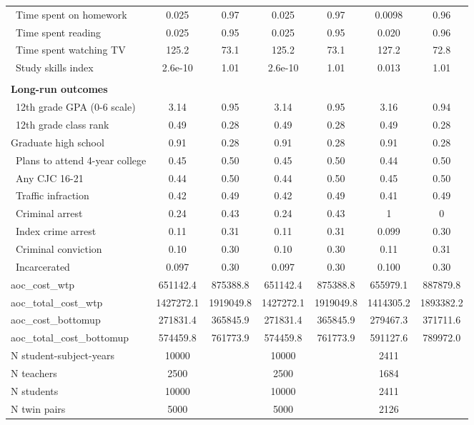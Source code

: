 {\begin{tabular}{l*{3}{cc}}
\ Time spent on homework&       0.025&        0.97&       0.025&        0.97&      0.0098&        0.96\\
\ Time spent reading&       0.025&        0.95&       0.025&        0.95&       0.020&        0.96\\
\ Time spent watching TV&       125.2&        73.1&       125.2&        73.1&       127.2&        72.8\\
\ Study skills index&     2.6e-10&        1.01&     2.6e-10&        1.01&       0.013&        1.01\\
\\ \textbf{Long-run outcomes}\\ \ 12th grade GPA (0-6 scale)&        3.14&        0.95&        3.14&        0.95&        3.16&        0.94\\
\ 12th grade class rank&        0.49&        0.28&        0.49&        0.28&        0.49&        0.28\\
Graduate high school&        0.91&        0.28&        0.91&        0.28&        0.91&        0.28\\
\ Plans to attend 4-year college&        0.45&        0.50&        0.45&        0.50&        0.44&        0.50\\
\ Any CJC 16-21&        0.44&        0.50&        0.44&        0.50&        0.45&        0.50\\
\ Traffic infraction&        0.42&        0.49&        0.42&        0.49&        0.41&        0.49\\
\ Criminal arrest&        0.24&        0.43&        0.24&        0.43&           1&           0\\
\ Index crime arrest&        0.11&        0.31&        0.11&        0.31&       0.099&        0.30\\
\ Criminal conviction&        0.10&        0.30&        0.10&        0.30&        0.11&        0.31\\
\ Incarcerated&       0.097&        0.30&       0.097&        0.30&       0.100&        0.30\\
aoc\_cost\_wtp&    651142.4&    875388.8&    651142.4&    875388.8&    655979.1&    887879.8\\
aoc\_total\_cost\_wtp&   1427272.1&   1919049.8&   1427272.1&   1919049.8&   1414305.2&   1893382.2\\
aoc\_cost\_bottomup&    271831.4&    365845.9&    271831.4&    365845.9&    279467.3&    371711.6\\
aoc\_total\_cost\_bottomup&    574459.8&    761773.9&    574459.8&    761773.9&    591127.6&    789972.0\\
\hline
N student-subject-years&       10000&            &       10000&            &        2411&            \\
N teachers  &        2500&            &        2500&            &        1684&            \\
N students  &       10000&            &       10000&            &        2411&            \\
N twin pairs&        5000&            &        5000&            &        2126&            \\
\hline\hline
\end{tabular}
}
